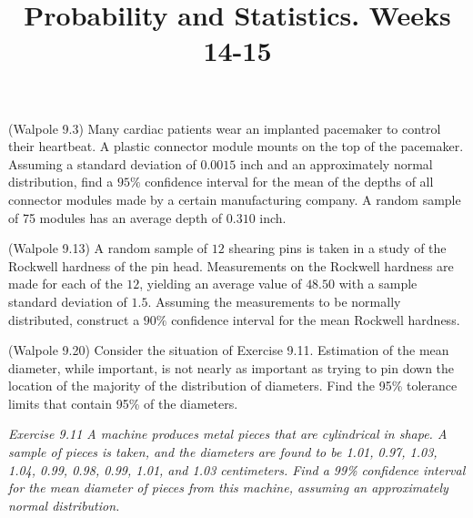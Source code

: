 \documentclass[14pt]{exam}
\title{Probability and Statistics. Weeks 14-15}
\date{}
\begin{document}
	\maketitle
	
	\begin{questions}
		\question
		(Walpole 9.3)
    		Many cardiac patients wear an implanted pacemaker to control their heartbeat. A plastic connector module mounts on the top of the pacemaker. Assuming a standard deviation of $0.0015$ inch and an approximately normal distribution, find a $95\%$ confidence interval for the mean of the depths of all connector modules made by a certain manufacturing company. A random sample of 75 modules has an average depth of $0.310$ inch.
		
		
		\question
		(Walpole 9.13)
                A random sample of $12$ shearing pins is taken in a study of the Rockwell hardness of the pin head. Measurements on the Rockwell hardness are made for each of the $12$, yielding an average value of $48.50$ with a sample standard deviation of $1.5$. Assuming the measurements to be normally distributed, construct a $90\% $ confidence interval for the mean Rockwell hardness.
		
		\question
		(Walpole 9.20)
		Consider the situation of Exercise 9.11. Estimation of the mean diameter, while important, is not nearly as important as trying to pin down the location of the majority of the distribution of diameters. Find the 95\% tolerance limits that contain 95\% of the diameters.
  
        \textit{Exercise 9.11 A machine produces metal pieces that are cylindrical
        in shape. A sample of pieces is taken, and the
        diameters are found to be 1.01, 0.97, 1.03, 1.04, 0.99,
        0.98, 0.99, 1.01, and 1.03 centimeters. Find a 99\% confidence
        interval for the mean diameter of pieces from
        this machine, assuming an approximately normal distribution.}
		

\end{questions}
\end{document}
